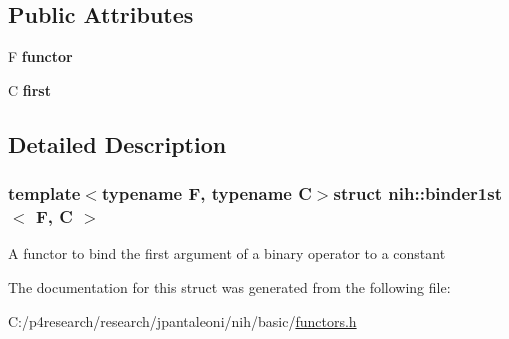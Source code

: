 \subsection*{\-Public \-Attributes}
\begin{DoxyCompactItemize}
\item 
\hypertarget{structnih_1_1binder1st_a06a83ba82d6042dedca47d9aed655cea}{
\-F {\bfseries functor}}
\label{structnih_1_1binder1st_a06a83ba82d6042dedca47d9aed655cea}

\item 
\hypertarget{structnih_1_1binder1st_aa0c033fa838a15f9bba5b02a5bcbe6c7}{
\-C {\bfseries first}}
\label{structnih_1_1binder1st_aa0c033fa838a15f9bba5b02a5bcbe6c7}

\end{DoxyCompactItemize}


\subsection{\-Detailed \-Description}
\subsubsection*{template$<$typename \-F, typename \-C$>$struct nih\-::binder1st$<$ F, C $>$}

\-A functor to bind the first argument of a binary operator to a constant 

\-The documentation for this struct was generated from the following file\-:\begin{DoxyCompactItemize}
\item 
\-C\-:/p4research/research/jpantaleoni/nih/basic/\hyperlink{functors_8h}{functors.\-h}\end{DoxyCompactItemize}
